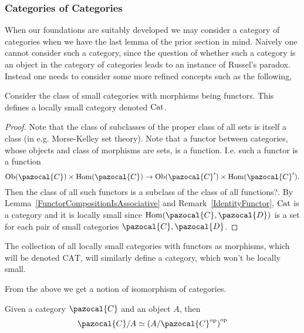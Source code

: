 \subsubsection{Categories of Categories}
When our foundations are suitably developed we may consider a category of categories when we have the last lemma of the prior section in mind. Naively one cannot consider such a category, since the question of whether such a category is an object in the category of categories leads to an instance of Russel's paradox. Instead one needs to consider some more refined concepts such as the following, 
\begin{proposition}
    Consider the class of small categories with morphisms being functors. This defines a locally small category denoted $\mathrm{Cat}$. 
\end{proposition}
\begin{proof}
    Note that the class of subclasses of the proper class of all sets is itself a class (in e.g. Morse-Kelley set theory). Note that a functor between categories, whose objects and class of morphisms are sets, is a function. I.e. such a functor 
    is a function 
    $$\Ob(\pazocal{C})\times \Hom(\pazocal{C}) \rightarrow \Ob(\pazocal{C}')\times \Hom(\pazocal{C}').$$
    Then the class of all such functors is a subclass of the class of all functions{\Large ?}. By Lemma~\ref{FunctorCompositionIsAssociative} and Remark~\ref{IdentityFunctor}, $\mathrm{Cat}$ is a category and it is locally small since $\Hom(\pazocal{C},\pazocal{D})$ is a set for each pair of small categories $\pazocal{C},\pazocal{D}$. 
\end{proof}
\begin{remark}
    The collection of all locally small categories with functors as morphisms, which will be denoted $\mathrm{CAT}$, will similarly define a category, which won't be locally small.  
\end{remark}
From the above we get a notion of isomorphism of categories.
\begin{proposition}
    Given a category $\pazocal{C}$ and an object $A$, then 
    $$\pazocal{C}/A \simeq \left(A/\pazocal{C}\op\right)\op$$
\end{proposition}
